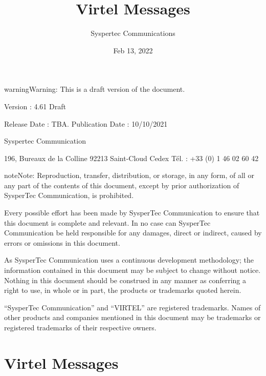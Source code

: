 \documentclass[letterpaper,10pt,english]{sphinxmanual}
\title{Virtel Messages}
\date{Feb 13, 2022}
\author{Syspertec Communications}
\begin{document}
\pagestyle{empty}
\sphinxmaketitle
\pagestyle{plain}
\sphinxtableofcontents
\pagestyle{normal}
\label{\detokenize{messages::doc}}




\begin{sphinxadmonition}{warning}{Warning:}
This is a draft version of the document.
\end{sphinxadmonition}

Version : 4.61 Draft

Release Date : TBA. Publication Date : 10/10/2021

Syspertec Communication

196, Bureaux de la Colline 92213 Saint-Cloud Cedex Tél. : +33 (0) 1 46 02 60 42


\begin{sphinxadmonition}{note}{Note:}
Reproduction, transfer, distribution, or storage, in any form, of all or any part of
the contents of this document, except by prior authorization of SysperTec
Communication, is prohibited.

Every possible effort has been made by SysperTec Communication to ensure that this document
is complete and relevant. In no case can SysperTec Communication be held responsible for
any damages, direct or indirect, caused by errors or omissions in this document.

As SysperTec Communication uses a continuous development methodology; the information
contained in this document may be subject to change without notice. Nothing in this
document should be construed in any manner as conferring a right to use, in whole or in
part, the products or trademarks quoted herein.

“SysperTec Communication” and “VIRTEL” are registered trademarks. Names of other products
and companies mentioned in this document may be trademarks or registered trademarks of
their respective owners.
\end{sphinxadmonition}


\chapter{Virtel Messages}
\label{\detokenize{messages:virtel-messages}}\label{\detokenize{messages:v461mg-introduction}}
\end{document}

